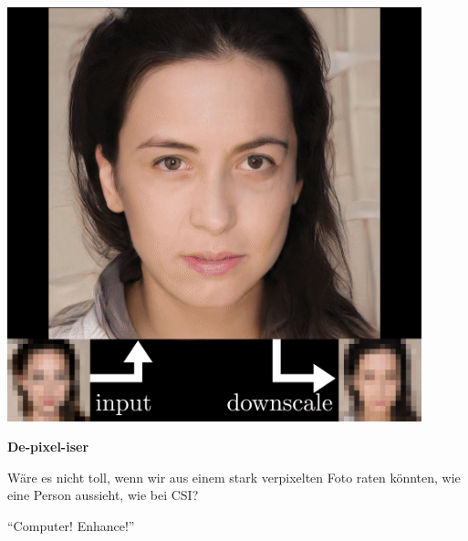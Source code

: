 \documentclass[aspectratio=169,usenames,dvipsnames]{beamer}
\begin{document}
\begin{frame}
\begin{minipage}{.5\textwidth}
\includegraphics[width=0.9\textwidth, keepaspectratio]{images/step5}
\end{minipage}\begin{minipage}{.5\textwidth}
\textbf{De-pixel-iser}
\bigskip

Wäre es nicht toll, wenn wir aus einem stark verpixelten Foto raten könnten, wie eine Person aussieht, wie bei CSI?
\bigskip

``Computer! Enhance!''
\end{minipage}
\end{frame}
\end{document}
